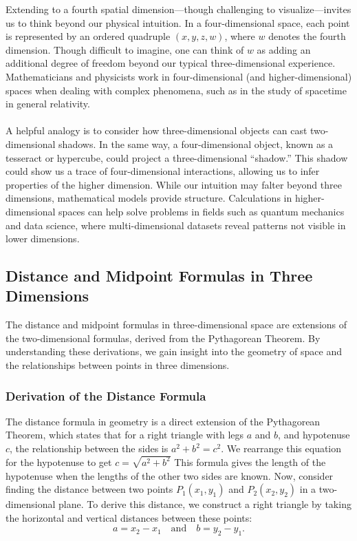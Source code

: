 \noindent Extending to a fourth spatial dimension—though challenging to visualize—invites us to think beyond our physical intuition. In a four-dimensional space, each point is represented by an ordered quadruple \( (x, y, z, w) \), where \( w \) denotes the fourth dimension. Though difficult to imagine, one can think of \( w \) as adding an additional degree of freedom beyond our typical three-dimensional experience. Mathematicians and physicists work in four-dimensional (and higher-dimensional) spaces when dealing with complex phenomena, such as in the study of spacetime in general relativity. \\ \\ A helpful analogy is to consider how three-dimensional objects can cast two-dimensional shadows. In the same way, a four-dimensional object, known as a tesseract or hypercube, could project a three-dimensional “shadow.” This shadow could show us a trace of four-dimensional interactions, allowing us to infer properties of the higher dimension. While our intuition may falter beyond three dimensions, mathematical models provide structure. Calculations in higher-dimensional spaces can help solve problems in fields such as quantum mechanics and data science, where multi-dimensional datasets reveal patterns not visible in lower dimensions.





\subsection*{Distance and Midpoint Formulas in Three Dimensions} 

The distance and midpoint formulas in three-dimensional space are extensions of the two-dimensional formulas, derived from the Pythagorean Theorem. By understanding these derivations, we gain insight into the geometry of space and the relationships between points in three dimensions.

\subsubsection*{Derivation of the Distance Formula}

The distance formula in geometry is a direct extension of the Pythagorean Theorem, which states that for a right triangle with legs \( a \) and \( b \), and hypotenuse \( c \), the relationship between the sides is $a^2 + b^2 = c^2.$ We rearrange this equation for the hypotenuse to get $c = \sqrt{a^2 + b^2}$ This formula gives the length of the hypotenuse when the lengths of the other two sides are known. Now, consider finding the distance between two points \( P_1(x_1, y_1) \) and \( P_2(x_2, y_2) \) in a two-dimensional plane. To derive this distance, we construct a right triangle by taking the horizontal and vertical distances between these points:
\[
a = x_2 - x_1 \quad \text{and} \quad b = y_2 - y_1.
\]

